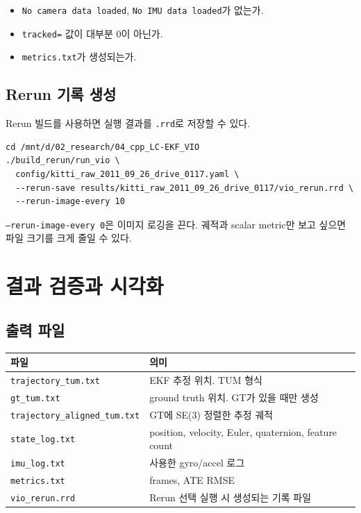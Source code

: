 \documentclass[11pt,a4paper,oneside]{report}
\begin{document}
\begin{itemize}[leftmargin=1.4em]
\item \texttt{No camera data loaded}, \texttt{No IMU data loaded}가 없는가.
\item \texttt{tracked=} 값이 대부분 0이 아닌가.
\item \texttt{metrics.txt}가 생성되는가.
\end{itemize}

\section{Rerun 기록 생성}

Rerun 빌드를 사용하면 실행 결과를 \texttt{.rrd}로 저장할 수 있다.

\begin{lstlisting}[style=shell,caption={Rerun 파일 저장 실행}]
cd /mnt/d/02_research/04_cpp_LC-EKF_VIO
./build_rerun/run_vio \
  config/kitti_raw_2011_09_26_drive_0117.yaml \
  --rerun-save results/kitti_raw_2011_09_26_drive_0117/vio_rerun.rrd \
  --rerun-image-every 10
\end{lstlisting}

\texttt{--rerun-image-every 0}은 이미지 로깅을 끈다. 궤적과 scalar metric만 보고 싶으면
파일 크기를 크게 줄일 수 있다.

\chapter{결과 검증과 시각화}

\section{출력 파일}

\begin{longtable}{p{}p{}}
\toprule
파일 & 의미 \\
\midrule
\texttt{trajectory\_tum.txt} & EKF 추정 위치. TUM 형식 \\
\texttt{gt\_tum.txt} & ground truth 위치. GT가 있을 때만 생성 \\
\texttt{trajectory\_aligned\_tum.txt} & GT에 SE(3) 정렬한 추정 궤적 \\
\texttt{state\_log.txt} & position, velocity, Euler, quaternion, feature count \\
\texttt{imu\_log.txt} & 사용한 gyro/accel 로그 \\
\texttt{metrics.txt} & frames, ATE RMSE \\
\texttt{vio\_rerun.rrd} & Rerun 선택 실행 시 생성되는 기록 파일 \\
\bottomrule
\end{longtable}
\end{document}
